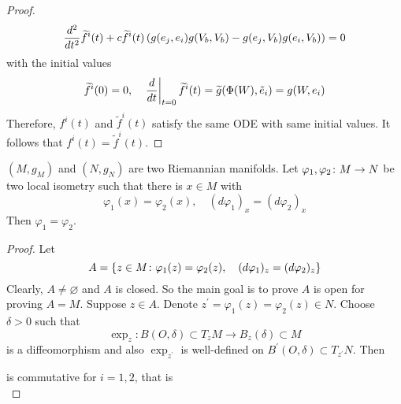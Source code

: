 \begin{enumerate}[label=\arabic{*}.]
\begin{proof}
		\begin{equation*}
			\frac{d^2}{dt^2}\widetilde{f}^i(t) + c\widetilde{f}^i(t)\left(g(e_j,e_i)g(V_b,V_b)-g(e_j,V_b)g(e_i,V_b)\right) = 0
		\end{equation*}
		with the initial values
		\begin{equation*}
			\widetilde{f}^i(0)=0,\quad \left.\frac{d}{dt}\right\lvert_{t=0}\widetilde{f}^i(t) = \widetilde{g}(\Phi(W),\tilde{e}_i) = g(W,e_i)
		\end{equation*}
		Therefore, $f^i(t)$ and $\widetilde{f}^i(t)$ satisfy the same ODE with same initial values. It follows that $f^i(t) = \widetilde{f}^i(t)$.
	\end{proof}

	\begin{lem}\label{lem:uniqofiso}
		$(M,g_M)$ and $(N,g_N)$ are two Riemannian manifolds. Let $\varphi_1,\varphi_2 \colon M \rightarrow N$ be two local isometry such that there is $x \in M$ with 
		\begin{equation*}
			\varphi_1(x) = \varphi_2(x),\quad (d\varphi_1)_x = (d\varphi_2)_x
		\end{equation*}
		Then $\varphi_1 = \varphi_2$.
	\end{lem}
	\begin{proof}
		Let
		\begin{equation*}
			A = \left\{z \in M \colon \varphi_1(z) = \varphi_2(z),\quad (d\varphi_1)_z = (d\varphi_2)_z\right\}
		\end{equation*}
		Clearly, $A \neq \varnothing$ and $A$ is closed. So the main goal is to prove $A$ is open for proving $A = M$. Suppose $z \in A$. Denote $z^\prime = \varphi_1(z) = \varphi_2(z) \in N$. Choose $\delta > 0$ such that
		\begin{equation*}
			\exp_z \colon B(O,\delta) \subset T_zM \longrightarrow B_z(\delta) \subset M
		\end{equation*}
		is a diffeomorphism and also $\exp_{z^\prime}$ is well-defined on $B^\prime(O,\delta) \subset T_{z^\prime}N$. Then
		\begin{center}
		\end{center}
		is commutative for $i = 1,2$, that is
		\begin{equation*}

\end{equation*}
\end{proof}
\end{enumerate}
